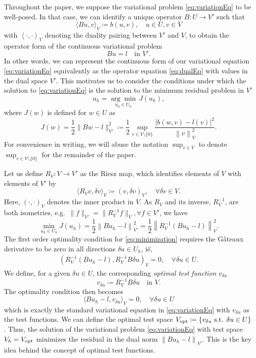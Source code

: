 \documentclass[11pt,onecolumn]{scrartcl}
\newcommand{\eqnlab}[1]{\label{eq:#1}}
\newcommand{\eqnref}[1]{\eqref{eq:#1}}
\newcommand{\nor}[1]{\left\| #1 \right\|}
\newcommand{\LRa}[1]{\left\langle #1 \right\rangle}
\begin{document}
Throughout the paper, we suppose the variational
problem \eqnref{variationEq} to be well-posed. In that case, we can
identify a unique operator $B:U\rightarrow V'$ such that
\[
\langle Bu,v\rangle_V \coloneqq b(u,v), \quad u\in U, v\in V
\]
with $\LRa{\cdot, \cdot}_V$ denoting the duality pairing between $V'$ and $V$, to obtain the operator form of the continuous variational problem
\begin{equation}
\eqnlab{dualEq}
Bu = l \quad \text{in } V'.
\end{equation}
In other words, we can represent the continuous form of our variational equation
\eqnref{variationEq} equivalently as the operator equation \eqnref{dualEq} with values in the
dual space $V'$.  This motivates us to consider the conditions under which the solution to \eqnref{variationEq} is the solution to the minimum residual problem in $V'$ 
\[
u_h = \underset{u_h\in U_h}{\arg\min}\, J(u_h),
\]
where $J(w)$ is defined for $w\in U$ as 
\[
J(w) = \frac{1}{2}\|Bw-l\|_{V'}^2 \coloneqq\frac{1}{2} \sup_{v\in V\setminus\{0\}} \frac{| b(w,v)-l(v)|^2}{\nor{v}_V^2}.
\]
For convenience in writing, we will abuse the notation $\sup_{v \in V}$ to denote $\sup_{v\in V\setminus\{0\}}$ for the remainder of the paper.

Let us define $R_V: V \to V'$ as the Riesz map, which identifies
elements of $V$ with elements of $V'$ by 
\[
\langle R_V v,\delta
v\rangle_V \coloneqq(v, \delta v)_V, \quad \forall \delta v \in V.
\]
Here, $(\cdot, \cdot)_V$ denotes the
inner product in $V$. As $R_V$ and its inverse, $R_V^{-1}$, are both
isometries, e.g.\ $\|f\|_{V'} = \|R_V^{-1} f\|_V, \forall f \in V'$, we
have
\begin{equation}
\eqnlab{minimization}
\min_{u_h\in U_h} J(u_h) = \frac{1}{2}\left\|Bu_h-l\right\|_{V'}^2 =  \frac{1}{2}\left\|R_V^{-1}(Bu_h-l)\right\|_V^2.
\end{equation}
The first order optimality condition for \eqnref{minimization} requires
the G\^ateaux derivative to be zero in all directions $\delta u \in
U_h$, i\.e\.,
\begin{align*}
\left(R_V^{-1}(Bu_h-l),R_V^{-1}B\delta u\right)_V = 0, \quad \forall \delta u \in U. 
\end{align*}
We define, for a given $\delta u \in U$, the corresponding {\em optimal test function} $v_{\delta u}$
\begin{equation}
\eqnlab{optv}
v_{\delta u} \coloneqq R_V^{-1}B\delta u \quad  \text{in } V.
\end{equation} 
The optimality condition then becomes
\[
 \langle Bu_h-l, v_{\delta u}\rangle_V = 0, \quad \forall \delta u \in U
\]
which is exactly the standard variational equation in
 \eqnref{variationEq} with $v_{\delta u}$ as the test functions. We can define the optimal test space $V_{\rm opt} \coloneqq \{v_{\delta u} \text{ s.t. } \delta u\in U\}$. Thus, the solution of the variational problem \eqnref{variationEq} with test space $V_h = V_{\rm opt}$ minimizes the residual in the dual norm $\nor{Bu_h-l}_{V'}$. This is the key idea behind the concept of optimal test functions. 
\end{document}
